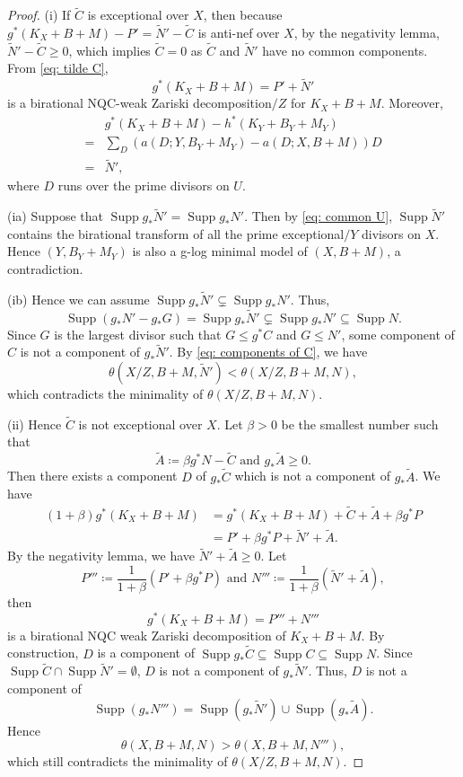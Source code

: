 \documentclass[11pt]{amsart}
\newcommand{\Supp}{\operatorname{Supp}}
\begin{document}
\begin{proof}
(i) If $\tilde C$ is exceptional over $X$, then because $g^*(K_X+B+M)-P'=\tilde N'-\tilde C$ is anti-nef over $X$, by the negativity lemma, $\tilde N'-\tilde C \geq 0$, which implies $\tilde C=0$ as $\tilde C$ and $\tilde N'$ have no common components. From \eqref{eq: tilde C},
\[
g^*(K_X+B+M)= P'+\tilde N'
\]
	is a birational NQC-weak Zariski decomposition$/Z$ for $K_X+B+M$. Moreover,
	\[
	\begin{split}
	&g^*(K_X+B+M)-h^*(K_Y+B_Y+M_Y)\\
	=&\sum_D \left(a(D; Y, B_Y+M_Y)-a(D;X, B+M)\right)D\\
	=&\tilde N',
	\end{split}
	\] 
	where $D$ runs over the prime divisors on $U$.
	
	(ia) Suppose that $\Supp g_*\tilde N' = \Supp g_*N'$. Then by \eqref{eq: common U}, $\Supp \tilde N'$ contains the birational transform of all the prime exceptional$/Y$ divisors on $X$. Hence $(Y, B_Y+M_Y)$ is also a g-log minimal model of $(X, B+M)$, a contradiction.
	
	
	(ib) Hence we can assume $\Supp g_*\tilde N' \subsetneq \Supp g_*N'$. Thus,
	$$\Supp(g_{*}N'-g_{*}G)=\Supp g_{*}\tilde N'\subsetneq \Supp g_{*} N'\subseteq \Supp N.$$
	Since $G$ is the largest divisor such that $G \leq g^{*}C$ and $G \leq N'$, some component of $C$ is not a component of $g_*\tilde N'$. By \eqref{eq: components of C}, we have
	\[
	\theta(X/Z, B+M, \tilde N') <\theta(X/Z, B+M, N),
	\] 
	which contradicts the minimality of $\theta(X/Z, B+M, N)$.
	
	
	
	(ii) Hence $\tilde C$ is not exceptional over $X$. Let $\beta>0$ be the smallest number such that
	\[
	\tilde A \coloneqq \beta g^*N-\tilde C \text{~and~} g_*\tilde A \geq 0.
	\] Then there exists a component $D$ of $g_*\tilde C$ which is not a component of $g_*\tilde A$. We have
	\[
	\begin{split}
	(1+\beta)g^*(K_X+B+M) &= g^*(K_X+B+M) +\tilde C+\tilde A+\beta g^*P\\
	&=P'+\beta g^*P+\tilde N' + \tilde A.
	\end{split}
	\] 
	By the negativity lemma, we have $\tilde N' + \tilde A \geq 0$. Let 
	\[
	P''' \coloneqq\frac{1}{1+\beta}(P'+\beta g^*P) \text{~and~}  N'''\coloneqq\frac{1}{1+\beta}(\tilde N' + \tilde A),
	\] then
	\[
	g^*(K_X+B+M) = P'''+N'''
	\] is a birational NQC weak Zariski decomposition of $K_X+B+M$. By construction, $D$ is a component of $\Supp g_{*}\tilde C\subseteq \Supp C \subseteq \Supp N$. Since $\Supp\tilde C \cap \Supp\tilde N' = \emptyset$, $D$ is not a component of $g_{*}\tilde N'$. Thus, $D$ is not a component of 
	\[
	\Supp( g_*N''')=\Supp(g_{*}\tilde N')\cup\Supp (g_{*}\tilde {A}).
	\] Hence
	\[
	\theta(X, B+M,N)>\theta(X,B+M,N'''),
	\]
	which still contradicts the minimality of $\theta(X/Z, B+M, N)$.
\end{proof}
\end{document}
